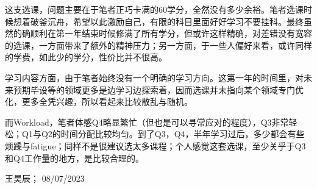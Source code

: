这支选课，问题主要在于笔者正巧卡满的60学分，全然没有多少余裕。笔者选课时候想着破釜沉舟，希望以此激励自己，有限的科目里面好好学习不要挂科。最终虽然的确顺利在第一年结束时候修满了所有学分，但或许这样精确，对差错没有宽容的选课，一方面带来了额外的精神压力；另一方面，于一些人偏好来看，或许同样的学费，如此少的学分，性价比并不很高。

学习内容方面，由于笔者始终没有一个明确的学习方向。这第一年的时间里，对未来预期毕设等的领域更多是边学习边探索着，因而选课并未指向某个领域专门优化，更多全凭兴趣，所以看起来比较散乱与随机。

而Workload，笔者体感Q4略显繁忙（但也是可以寻常应对的程度），Q3非常轻松；Q1与Q2的时间分配比较均匀。到了Q3，Q4，半年学习过后，多少都会有些烦躁与fatigue；同样不是很建议选太多课程；个人感觉这套选课，至少关乎于Q3和Q4工作量的地方，是比较合理的。
\begin{flushright}
王昊辰； 08/07/2023
\end{flushright}


